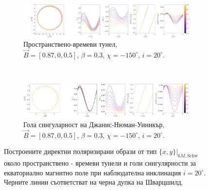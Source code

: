 \documentclass[12pt]{article}
\numberwithin{equation}{section}
\numberwithin{figure}{section}
\begin{document}
	\begin{figure}[!htb]
		\begin{subfigure}{16cm}
			\hspace{-1.0em}
			\includegraphics[scale = 0.15]{Section_7_Polarized_Emission/WH_delta_fig_B_0.87_0.5_0_20_deg_r6.png}
			\caption{Пространствено-времеви тунел,\\ $\vec{B} = [0.87, 0, 0.5]$, $\beta = 0.3$, $\chi = -150^\circ$, $i = 20^\circ$.} 
		\end{subfigure}\\
		\begin{subfigure}{17cm}
			\hspace{-0.2em}
			\includegraphics[scale = 0.15]{Section_7_Polarized_Emission/JNW_delta_figs_B_0.87_0.0_0.5_20_deg_direct.png}
			\caption{Гола сингуларност на Джанис-Нюман-Уиникър,\\  $\vec{B} = [0.87, 0, 0.5]$, $\beta = 0.3$, $\chi = -150^\circ$, $i = 20^\circ$.}
		\end{subfigure}
		\caption[Поляризирани директни образи около пространствено - времеви тунели и голи сингулярности за екваториално магнитно поле при $i = 20^\circ$.]{\small Построените директни поляризирани образи от тип $\{x,y\}\vert_{6M, \text{Schw}}$ около пространствено - времеви тунели  и голи сингулярности за екваториално магнитно поле при наблюдателна инклинация $i = 20^\circ$. Черните линии съответстват на черна дупка на Шварцшилд.} 
		\label{Direct_image_deltas_20}
	\end{figure}
	
\end{document}
